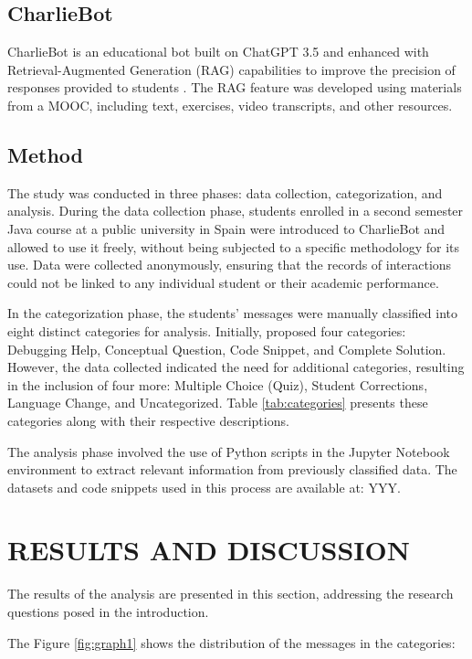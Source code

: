 \documentclass[a4paper,twoside]{article}
\begin{document}
\subsection{CharlieBot}

CharlieBot is an educational bot built on ChatGPT 3.5 and enhanced with
Retrieval-Augmented Generation (RAG) capabilities to improve the precision of
responses provided to students \cite{Sun24}. The RAG feature was developed using
materials from a MOOC, including text, exercises, video transcripts, and other
resources.

\subsection{Method}

The study was conducted in three phases: data collection,
categorization, and analysis. During the data collection phase, students
enrolled in a second semester Java course at a public university in Spain were
introduced to CharlieBot and allowed to use it freely, without being subjected
to a specific methodology for its use. Data were collected anonymously, ensuring
that the records of interactions could not be linked to any individual student
or their academic performance.

In the categorization phase, the students' messages were manually classified
into eight distinct categories for analysis. Initially, \cite{Ghimire24}
proposed four categories: Debugging Help, Conceptual Question, Code Snippet,
and Complete Solution. However, the data collected indicated the need for
additional categories, resulting in the inclusion of four more: Multiple Choice
(Quiz), Student Corrections, Language Change, and Uncategorized. Table
\ref{tab:categories} presents these categories along with their respective
descriptions.

The analysis phase involved the use of Python scripts in the Jupyter Notebook
environment to extract relevant information from previously classified
data. The datasets and code snippets used in this process are available at: YYY.

\section{\uppercase{Results and Discussion}}

The results of the analysis are presented in this section, addressing the
research questions posed in the introduction.

The Figure \ref{fig:graph1} shows the distribution of the messages in the
categories:
\end{document}
